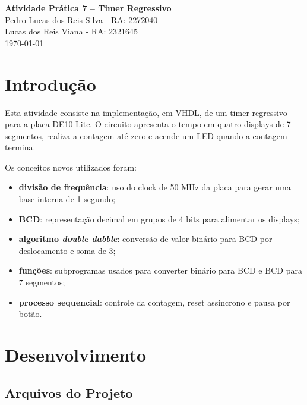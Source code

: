 \documentclass[12pt,a4paper, brazil]{article}
\begin{document}
\begin{center}
{\textbf {\huge Atividade Prática 7 -- Timer Regressivo}}\\[5mm]
{\large Pedro Lucas dos Reis Silva - RA: 2272040} \\[5mm]
{\large Lucas dos Reis Viana - RA: 2321645} \\[5mm]
\today\\[5mm]
\end{center}

\section{Introdução}

Esta atividade consiste na implementação, em VHDL, de um timer regressivo para a placa DE10-Lite. O circuito apresenta o tempo em quatro displays de 7 segmentos, realiza a contagem até zero e acende um LED quando a contagem termina.

Os conceitos novos utilizados foram:

\begin{itemize}
    \item \textbf{divisão de frequência}: uso do clock de 50 MHz da placa para gerar uma base interna de 1 segundo;
    \item \textbf{BCD}: representação decimal em grupos de 4 bits para alimentar os displays;
    \item \textbf{algoritmo \textit{double dabble}}: conversão de valor binário para BCD por deslocamento e soma de 3;
    \item \textbf{funções}: subprogramas usados para converter binário para BCD e BCD para 7 segmentos;
    \item \textbf{processo sequencial}: controle da contagem, reset assíncrono e pausa por botão.
\end{itemize}

\section{Desenvolvimento}

\subsection{Arquivos do Projeto}
\end{document}
